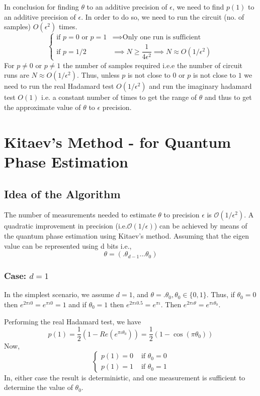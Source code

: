 In conclusion for finding $\theta$ to an additive precision of $\epsilon$, we need to find $p(1)$ to an additive precision of $\epsilon$. In order to do so, we need to run the circuit (no. of samples) $O(\epsilon^2)$ times.
\[
\begin{cases} \text{if } p=0 \text{ or } p=1 & \implies \text{Only one run is sufficient}\\
\text{if } p=1/2 &\implies N\geq \dfrac{1}{4\epsilon^2} \implies N\approx O(1/\epsilon^2) \end{cases}
\]
For $p\neq 0$ or $p\neq 1$ the number of samples required i.e.e the number of circuit runs are $N\approx O(1/\epsilon^2)$. Thus, unless $p$ is not close to $0$ or $p$ is not close to $1$ we need to run the real Hadamard test $O(1/\epsilon^2)$ and run the imaginary hadamard test $O(1)$ i.e. a constant number of times to get the range of $\theta$ and thus to get the approximate value of $\theta$ to $\epsilon$ precision.

\section{Kitaev's Method - for Quantum Phase Estimation}
\subsection{Idea of the Algorithm}
The number of measurements needed to estimate $\theta$ to precision $\epsilon$ is $\mathcal{O}(1/\epsilon^2)$.
A quadratic improvement in precision (i.e.$\mathcal{O}(1/\epsilon)$) can be achieved by means of the quantum phase estimation using Kitaev's method.
Assuming that the eigen value can be represented using d bits i.e.,
\[
\theta = (.\theta_{d-1}...\theta_0) 
\]
\subsubsection{Case: $d=1$}
In the simplest scenario, we assume $d=1$, and $\theta =.\theta_0, \theta_0 \in \{0,1\}$. Thus, if $\theta_0=0$ then $e^{2\pi\iota 0}=e^{\pi\iota 0}=1$ and if $\theta_0=1$ then $e^{2\pi\iota 0.5}=e^{\pi\iota}$. Then $e^{2\pi\iota \theta}=e^{\pi\iota \theta_0}$.

Performing the real Hadamard test, we have
\[
p(1)=\frac{1}{2}(1-Re(e^{\pi\iota \theta_0}))=\frac{1}{2}(1-\cos(\pi\theta_0))
\]
Now, 
\[
\begin{cases} p(1)=0 &\text{ if } \theta_0=0 \\
p(1)=1 &\text{ if } \theta_0=1\end{cases}
\]
In, either case the result is deterministic, and one measurement is sufficient to determine the 
value of $\theta_0$.

